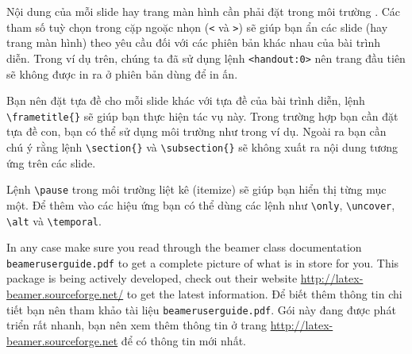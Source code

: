 Nội dung của mỗi slide hay trang màn hình cần phải đặt trong môi trường . Các tham số tuỳ chọn trong cặp ngoặc nhọn (\verb|<| và \verb|>|) sẽ giúp bạn ẩn các slide (hay trang màn hình) theo yêu cầu đối với các phiên bản khác nhau của bài trình diễn. Trong ví dụ trên, chúng ta đã sử dụng lệnh \verb|<handout:0>| nên trang đầu tiên sẽ không được in ra ở phiên bản dùng để in ấn.

Bạn nên đặt tựa đề cho mỗi slide khác với tựa đề của bài trình diễn, lệnh \verb|\frametitle{}| sẽ giúp bạn thực hiện tác vụ này. Trong trường hợp bạn cần đặt tựa đề con, bạn có thể sử dụng môi trường  như trong ví dụ. Ngoài ra bạn cần chú ý rằng lệnh \verb|\section{}| và \verb|\subsection{}| sẽ không xuất ra nội dung tương ứng trên các slide.

Lệnh \verb|\pause| trong môi trường liệt kê (itemize) sẽ giúp bạn hiển thị từng mục một. Để thêm vào các hiệu ứng bạn có thể dùng các lệnh như \verb|\only|, \verb|\uncover|, \verb|\alt| và \verb|\temporal|. 

In any case make sure you read through the beamer class documentation
\texttt{beameruserguide.pdf} to get a complete picture of what is in
store for you. This package is being actively developed, check out their website
\href{http://latex-beamer.sourceforge.net/}{http://latex-beamer.sourceforge.net/}
to get the latest information.
Để biết thêm thông tin chi tiết bạn nên tham khảo tài liệu \texttt{beameruserguide.pdf}. Gói này đang được phát triển rất nhanh, bạn nên xem thêm thông tin ở trang \href{http://latex-beamer.sourceforge.net/}{http://latex-beamer.sourceforge.net} để có thông tin mới nhất.

